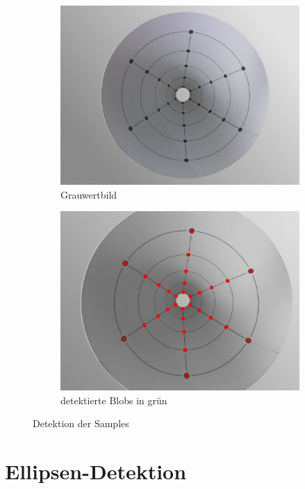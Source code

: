 \begin{figure}[!htb]
	\centering
	\begin{subfigure}{.5\textwidth}
		\centering
		\includegraphics[width=.9\textwidth]{images/coneRasp.jpg}
		\caption{Grauwertbild}
	\end{subfigure}%
	\begin{subfigure}{.5\textwidth}
		\centering
		\includegraphics[width=.9\textwidth]{images/coneRaspDetectedDots.png}
		\caption{detektierte Blobs in grün}
	\end{subfigure}
	\caption{Detektion der Samples}
	\label{fig:blobDetect}
\end{figure}


\section{Ellipsen-Detektion}
\label{s:ellipseDetection}

